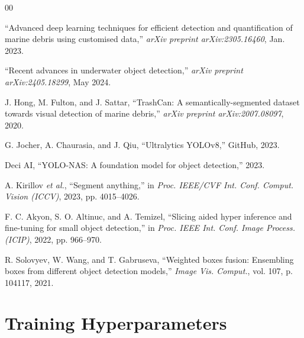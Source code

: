 \documentclass[conference]{IEEEtran}
\begin{document}
\begin{thebibliography}{00}

``Advanced deep learning techniques for efficient detection and
quantification of marine debris using customised data,''
\textit{arXiv preprint arXiv:2305.16460}, Jan. 2023.

``Recent advances in underwater object detection,''
\textit{arXiv preprint arXiv:2405.18299}, May 2024.

J. Hong, M. Fulton, and J. Sattar, ``TrashCan: A semantically-segmented
dataset towards visual detection of marine debris,''
\textit{arXiv preprint arXiv:2007.08097}, 2020.

G. Jocher, A. Chaurasia, and J. Qiu, ``Ultralytics YOLOv8,''
GitHub, 2023.

Deci AI, ``YOLO-NAS: A foundation model for object detection,'' 2023.

A. Kirillov \textit{et al.}, ``Segment anything,''
in \textit{Proc. IEEE/CVF Int. Conf. Comput. Vision (ICCV)},
2023, pp. 4015--4026.

F. C. Akyon, S. O. Altinuc, and A. Temizel,
``Slicing aided hyper inference and fine-tuning for small object
detection,'' in \textit{Proc. IEEE Int. Conf. Image Process. (ICIP)},
2022, pp. 966--970.

R. Solovyev, W. Wang, and T. Gabruseva,
``Weighted boxes fusion: Ensembling boxes from different object detection
models,'' \textit{Image Vis. Comput.}, vol. 107, p. 104117, 2021.

\end{thebibliography}


\appendix

\section{Training Hyperparameters}
\end{document}
